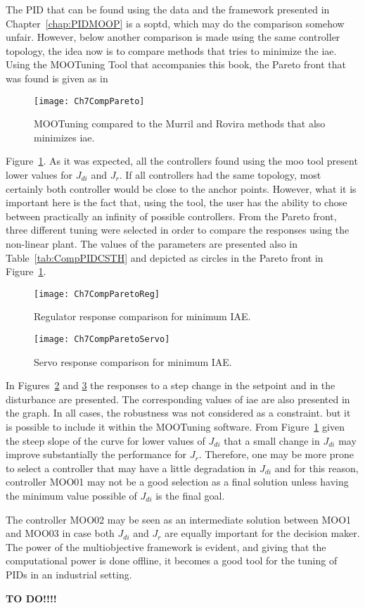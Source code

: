 The PID that can be found using the data and the framework presented in Chapter~\ref{chap:PIDMOOP} is a \gls{soptd}, which may do the comparison somehow unfair. However, below another comparison is made using the same controller topology, the idea now is to compare methods that tries to minimize the \gls{iae}. Using the MOOTuning Tool that accompanies this book, the Pareto front that was found is given as in %
%
\begin{figure}[tb]
	\centering
	\texttt{[image: Ch7CompPareto]}
	\caption{MOOTuning compared to the Murril and Rovira methods that also minimizes \gls{iae}.}
	\label{fig:Ch7CompPareto}
\end{figure}
%
Figure~\ref{fig:Ch7CompPareto}. As it was expected, all the controllers found using the \gls{moo} tool present lower values for $J_{di}$ and $J_r$. If all controllers had the same topology, most certainly both controller would be close to the anchor points. However, what it is important here is the fact that, using the tool, the user has the ability to chose between practically an infinity of possible controllers. From the Pareto front, three different tuning were selected in order to compare the responses using the non-linear plant. The values of the parameters are presented also in Table~\ref{tab:CompPIDCSTH} and depicted as circles in the Pareto front in Figure~\ref{fig:Ch7CompPareto}.
%
\begin{figure}[tb]
	\centering
	\texttt{[image: Ch7CompParetoReg]}
	\caption{Regulator response comparison for minimum IAE.}
	\label{fig:Ch7CompParetoReg}
\end{figure}
%
\begin{figure}[tb]
	\centering
	\texttt{[image: Ch7CompParetoServo]}
	\caption{Servo response comparison for minimum IAE.}
	\label{fig:Ch7CompParetoServo}
\end{figure}

In Figures~\ref{fig:Ch7CompParetoReg} and \ref{fig:Ch7CompParetoServo} the responses to a step change in the setpoint and in the disturbance are presented. The corresponding values of \gls{iae} are also presented in the graph. In all cases, the robustness was not considered as a constraint. but it is possible to include it within the MOOTuning software. From Figure~\ref{fig:Ch7CompPareto} given the steep slope of the curve for lower values of $J_{di}$ that a small change in $J_{di}$ may improve substantially the performance for $J_r$. Therefore, one may be more prone to select a controller that may have a little degradation in $J_{di}$ and for this reason, controller MOO01 may not be a good selection as a final solution unless having the minimum value possible of $J_{di}$ is the final goal.

The controller MOO02 may be seen as an intermediate solution between MOO1 and MOO03 in case both $J_{di}$ and $J_r$ are equally important for the decision maker. The power of the multiobjective framework is evident, and giving that the computational power is done offline, it becomes a good tool for the tuning of PIDs in an industrial setting.

\textbf{TO DO!!!!}